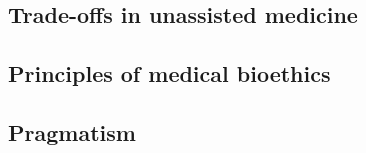 
\subsection{Trade-offs in unassisted medicine}

\subsection{Principles of medical bioethics}

\subsection{Pragmatism}
